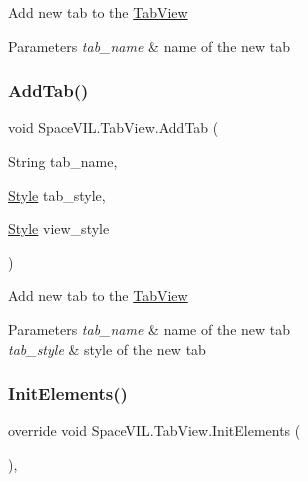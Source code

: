 Add new tab to the \mbox{\hyperlink{class_space_v_i_l_1_1_tab_view}{Tab\+View}} 


\begin{DoxyParams}{Parameters}
{\em tab\+\_\+name} & name of the new tab \\
\hline
\end{DoxyParams}
\mbox{\label{class_space_v_i_l_1_1_tab_view_a08c96af296bf4e6485deb5def851d904}} 
\subsubsection{\texorpdfstring{Add\+Tab()}{AddTab()}\hspace{0.1cm}{\footnotesize\ttfamily [2/2]}}
{\footnotesize\ttfamily void Space\+V\+I\+L.\+Tab\+View.\+Add\+Tab (\begin{DoxyParamCaption}\item[{String}]{tab\+\_\+name,  }\item[{\mbox{\hyperlink{class_space_v_i_l_1_1_decorations_1_1_style}{Style}}}]{tab\+\_\+style,  }\item[{\mbox{\hyperlink{class_space_v_i_l_1_1_decorations_1_1_style}{Style}}}]{view\+\_\+style }\end{DoxyParamCaption})\hspace{0.3cm}{\ttfamily [inline]}}



Add new tab to the \mbox{\hyperlink{class_space_v_i_l_1_1_tab_view}{Tab\+View}} 


\begin{DoxyParams}{Parameters}
{\em tab\+\_\+name} & name of the new tab \\
\hline
{\em tab\+\_\+style} & style of the new tab \\
\hline
\end{DoxyParams}
\mbox{\label{class_space_v_i_l_1_1_tab_view_ae19ec535e78dee9eca9ac433e2b2bca5}} 
\subsubsection{\texorpdfstring{Init\+Elements()}{InitElements()}}
{\footnotesize\ttfamily override void Space\+V\+I\+L.\+Tab\+View.\+Init\+Elements (\begin{DoxyParamCaption}{ }\end{DoxyParamCaption})\hspace{0.3cm}{\ttfamily [inline]}, {\ttfamily [virtual]}}




